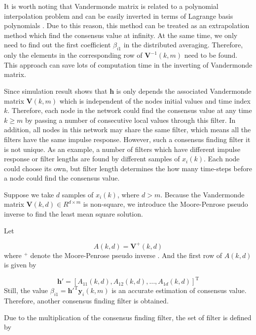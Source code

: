 It is worth noting that Vandermonde matrix is related to a polynomial
interpolation problem and can be easily inverted in terms of Lagrange
basis polynomials \cite{Prass2007}. Due to this reason, this method
can be treated as an extrapolation method which find the consensus
value at infinity. At the same time, we only need to find out the
first coefficient $\beta_{i1}$ in the distributed averaging. Therefore,
only the elements in the corresponding row of $\mathbf{V}^{-1}(k,m)$
need to be found. This approach can save lots of computation time
in the inverting of Vandermonde matrix. 

Since simulation result shows that $\mathbf{h}$ is only depends the
associated Vandermonde matrix $\mathbf{V}(k,m)$ which is independent
of the nodes initial values and time index $k$. Therefore, each node
in the network could find the consensus value at any time $k\geqslant m$
by passing a number of consecutive local values through this filter.
In addition, all nodes in this network may share the same filter,
which means all the filters have the same impulse response. However,
such a consensus finding filter it is not unique. As an example, a
number of filters which have different impulse response or filter
lengths are found by different samples of $x_{i}(k)$.  Each node
could choose its own, but filter length determines the how many time-steps
before a node could find the consensus value. 

Suppose we take $d$ samples of $x_{i}(k)$, where $d>m$. Because
the Vandermonde matrix $\mathbf{V}(k,d)\in R^{d\times m}$ is non-square,
we introduce the Moore-Penrose pseudo inverse to find the least mean
square solution. 

Let

\begin{equation}
A(k,d)=\mathbf{V}^{+}(k,d)
\end{equation}
where $^{+}$ denote the Moore-Penrose pseudo inverse \cite{Piziak2007}.
And the first row of $A(k,d)$ is given by 

\begin{equation}
\mathbf{h}'=\left[A{}_{11}(k,d),A_{12}(k,d),\ldots,A_{1d}(k,d)\right]^{\mathrm{T}}
\end{equation}
Still, the value $\beta_{i1}=\mathbf{h}'^{\mathrm{T}}\mathbf{y}_{i}(k,m)$
is an accurate estimation of consensus value. Therefore, another consensus
finding filter is obtained.

Due to the multiplication of the consensus finding filter, the set
of filter is defined by

